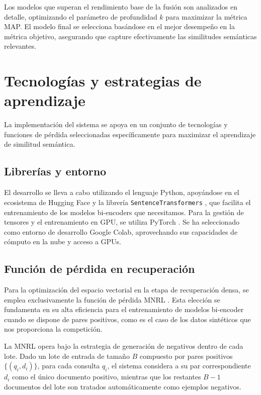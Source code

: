 Los modelos que superan el rendimiento base de la fusión son analizados en detalle, optimizando el parámetro de profundidad $k$ para maximizar la métrica \gls{MAP}. El modelo final se selecciona basándose en el mejor desempeño en la métrica objetivo, asegurando que capture efectivamente las similitudes semánticas relevantes.


\section{Tecnologías y estrategias de aprendizaje}

\noindent La implementación del sistema se apoya en un conjunto de tecnologías y funciones de pérdida seleccionadas específicamente para maximizar el aprendizaje de similitud semántica.

\subsection{Librerías y entorno}

\noindent El desarrollo se lleva a cabo utilizando el lenguaje Python, apoyándose en el ecosistema de Hugging Face y la librería \texttt{SentenceTransformers} \cite{reimers2019sentence}, que facilita el entrenamiento de los modelos bi-encoders que necesitamos. Para la gestión de tensores y el entrenamiento en GPU, se utiliza PyTorch \cite{paszke2019pytorch}. Se ha seleccionado como entorno de desarrollo Google Colab, aprovechando sus capacidades de cómputo en la nube y acceso a GPUs. 

\subsection{Función de pérdida en recuperación}
\label{sec:Funciones_de_perdida}

\noindent Para la optimización del espacio vectorial en la etapa de recuperación densa, se emplea exclusivamente la función de pérdida \gls{MNRL} \cite{henderson2017efficient}. Esta elección se fundamenta en su alta eficiencia para el entrenamiento de modelos bi-encoder cuando se dispone de pares positivos, como es el caso de los datos sintéticos que nos proporciona la competición.

La \gls{MNRL} opera bajo la estrategia de generación de negativos dentro de cada lote. Dado un lote de entrada de tamaño $B$ compuesto por pares positivos $\{(q_i, d_i)\}$, para cada consulta $q_i$, el sistema considera a su par correspondiente $d_i$ como el único documento positivo, mientras que los restantes $B-1$ documentos del lote son tratados automáticamente como ejemplos negativos. 

